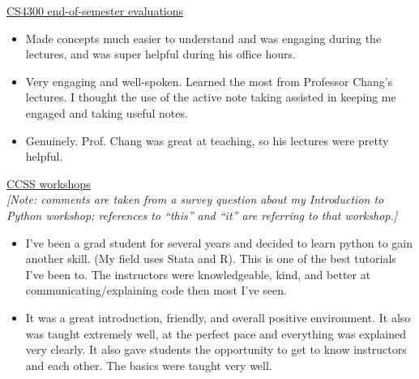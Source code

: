 \documentclass[12pt,letterpaper]{article}
\begin{document}
\noindent\underline{CS4300 end-of-semester evaluations}
\begin{itemize}
    \item Made concepts much easier to understand and was engaging during the lectures, and was super helpful during his office hours.
    \item Very engaging and well-spoken. Learned the most from Professor Chang's lectures. I thought the use of the active note taking assisted in keeping me engaged and taking useful notes.
    \item Genuinely. Prof. Chang was great at teaching, so his lectures were pretty helpful.
\end{itemize}

\noindent\underline{CCSS workshops}\\
\emph{[Note: comments are taken from a survey question about my Introduction to Python workshop; references to ``this'' and ``it'' are referring to that workshop.]}
\begin{itemize}
    \item I've been a grad student for several years and decided to learn python to gain another skill. (My field uses Stata and R). This is one of the best tutorials I've been to. The instructors were knowledgeable, kind, and better at communicating/explaining code then most I've seen. 
    \item It was a great introduction, friendly, and overall positive environment. It also was taught extremely well, at the perfect pace and everything was explained very clearly. It also gave students the opportunity to get to know instructors and each other. The basics were taught very well.
\end{itemize}

\else
%
\fi
\end{document}
